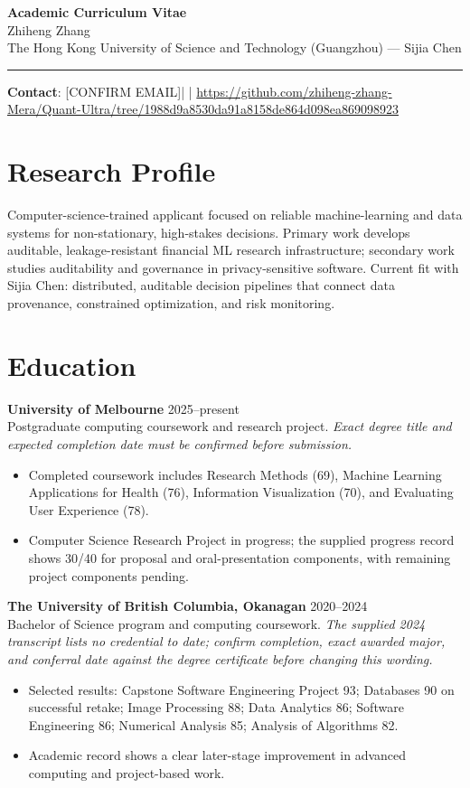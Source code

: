 \documentclass[11pt]{article}
\newcommand{\ApplicantName}{Zhiheng Zhang}
\newcommand{\ApplicantEmail}{[CONFIRM EMAIL]}
\newcommand{\ApplicantPhone}{[CONFIRM PHONE]}
\newcommand{\ApplicantGitHub}{\url{https://github.com/zhiheng-zhang-Mera/Quant-Ultra/tree/1988d9a8530da91a8158de864d098ea869098923}}
\begin{document}
\begin{center}
{\LARGE\bfseries Academic Curriculum Vitae}\\[0.25em]
{\large \ApplicantName}\\
The Hong Kong University of Science and Technology (Guangzhou) --- Sijia Chen
\end{center}
\vspace{0.35em}\hrule\vspace{0.65em}

\textbf{Contact}: \ApplicantEmail\quad | \quad \ApplicantPhone\quad | \quad \ApplicantGitHub

\section*{Research Profile}
Computer-science-trained applicant focused on reliable machine-learning and data systems for non-stationary, high-stakes decisions. Primary work develops auditable, leakage-resistant financial ML research infrastructure; secondary work studies auditability and governance in privacy-sensitive software. Current fit with Sijia Chen: distributed, auditable decision pipelines that connect data provenance, constrained optimization, and risk monitoring.

\section*{Education}
\textbf{University of Melbourne} \hfill 2025--present\\
Postgraduate computing coursework and research project. \textit{Exact degree title and expected completion date must be confirmed before submission.}
\begin{itemize}
\item Completed coursework includes Research Methods (69), Machine Learning Applications for Health (76), Information Visualization (70), and Evaluating User Experience (78).
\item Computer Science Research Project in progress; the supplied progress record shows 30/40 for proposal and oral-presentation components, with remaining project components pending.
\end{itemize}

\textbf{The University of British Columbia, Okanagan} \hfill 2020--2024\\
Bachelor of Science program and computing coursework. \textit{The supplied 2024 transcript lists no credential to date; confirm completion, exact awarded major, and conferral date against the degree certificate before changing this wording.}
\begin{itemize}
\item Selected results: Capstone Software Engineering Project 93; Databases 90 on successful retake; Image Processing 88; Data Analytics 86; Software Engineering 86; Numerical Analysis 85; Analysis of Algorithms 82.
\item Academic record shows a clear later-stage improvement in advanced computing and project-based work.
\end{itemize}
\end{document}
